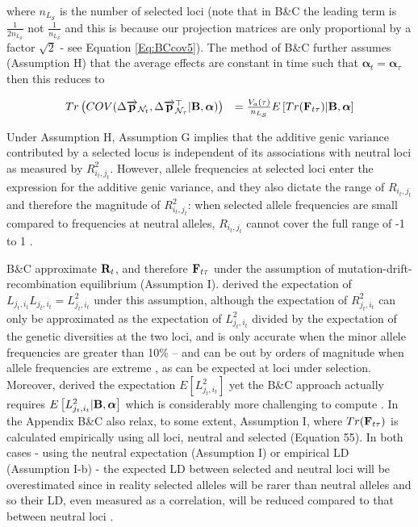 \documentclass[12pt]{article}
\begin{document}
\begin{bibunit}
where $n_{L_\mathcal{S}}$ is the number of selected loci (note that in B\&C  the leading term is $\frac{1}{2n_{L_\mathcal{S}}}$ not $\frac{1}{n_{L_\mathcal{S}}}$ and this is because our projection matrices are only proportional by a factor $\sqrt{2}$ -  see Equation \ref{Eq:BCcov5}). The method of B\&C further assumes (Assumption H) that the average effects are constant in time such that $\boldsymbol{\alpha}_t=\boldsymbol{\alpha}_\tau$ then this reduces to

\begin{equation}
\begin{array}{rl}
Tr\left(COV(\Delta \overrightarrow{\bf p}_{{\mathcal N}_t}, \Delta \overrightarrow{\bf p}_{{\mathcal N}_{\tau}}^\top | {\bf B}, \boldsymbol{\alpha}) \right)&=
\frac{V_a(\tau)}{n_{L_\mathcal{S}}}E\left[Tr({\bf F}_{t\tau}) | {\bf B}, \boldsymbol{\alpha}\right]\\
\end{array}
\label{Eq:BCcov11}
\end{equation}

Under Assumption H, Assumption G implies that the additive genic variance contributed by a selected locus is independent of its associations with neutral loci as measured by $R_{i_t,j_t}^2$. 
However, allele frequencies at selected loci enter the expression for the additive genic variance, and they also dictate the range of $R_{i_t,j_t}$ and therefore the magnitude of $R_{i_t,j_t}^2$: when selected allele frequencies are  small compared to frequencies at neutral alleles,  $R_{i_t,j_t}$ cannot cover the full range of -1 to 1 \citep{sved2018one}. 

B\&C approximate ${\bf R}_t$, and therefore ${\bf F}_{t\tau}$ under the assumption of mutation-drift-recombination equilibrium (Assumption I). \citet{Ohta.1971} derived the expectation of $L_{j_t, i_t}L_{j_t, i_t}=L^2_{j_t, i_t}$ under this assumption, although the expectation of $R^2_{j_t, i_t}$ can only be approximated as the expectation of $L^2_{j_t, i_t}$ divided by the expectation of the genetic diversities at the two loci, and is only accurate when the minor allele frequencies are greater than 10\%  \citep{McVean.2002} -- and can be out by orders of magnitude when allele frequencies are extreme \citep{Song.2007}, as can be expected at loci under selection.  Moreover,  \citet{Ohta.1971} derived the expectation $E[L^2_{j_t, i_t}]$ yet the B\&C approach actually requires $E\left[L^2_{j_t, i_t} | {\bf B}, \boldsymbol{\alpha}\right]$ which is considerably more challenging to compute \citep{good2022linkage}. In the Appendix B\&C also relax, to some extent, Assumption I, where $Tr({\bf F}_{t\tau})$ is calculated empirically using all loci, neutral and selected (Equation 55). In both cases - using the neutral expectation (Assumption I) or empirical LD (Assumption I-b) - the expected LD between selected and neutral loci will be overestimated since in reality selected alleles will be rarer than neutral alleles and so their LD, even measured as a correlation, will be reduced compared to that between neutral loci \citep{sved2018one}.


\end{bibunit}
\end{document}
